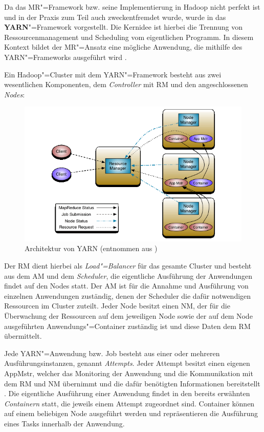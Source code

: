 Da das \ac{MR}"=Framework bzw. seine Implementierung in Hadoop nicht perfekt ist und in der Praxis zum Teil auch zweckentfremdet wurde, wurde in \cite{Vavilapalli2013} das \textbf{\ac{YARN}}"=Framework vorgestellt.
Die Kernidee ist hierbei die Trennung von Ressourcenmanagement und Scheduling vom eigentlichen Programm.
In diesem Kontext bildet der \ac{MR}"=Ansatz eine mögliche Anwendung, die mithilfe des \ac{YARN}"=Frameworks ausgeführt wird \cite{Vavilapalli2013}.

Ein Hadoop"=Cluster mit dem \ac{YARN}"=Framework besteht aus zwei wesentlichen Komponenten, dem \emph{Controller} mit \ac{RM} und den angeschlossenen \emph{Nodes}:

\begin{figure}[h]
    \includegraphics{./images/yarn_architecture.png}
    \caption[Architektur von YARN]
    {Architektur von YARN (entnommen aus \cite{HadoopYarnArch271})}
    \label{fig:yarnarch}
\end{figure}

Der \ac{RM} dient hierbei als \emph{Load"=Balancer} für das gesamte Cluster und besteht aus dem \ac{AM} und dem \emph{Scheduler}, die eigentliche Ausführung der Anwendungen findet auf den Nodes statt.
Der \ac{AM} ist für die Annahme und Ausführung von einzelnen Anwendungen zuständig, denen der Scheduler die dafür notwendigen Ressourcen im Cluster zuteilt.
Jeder Node besitzt einen \ac{NM}, der für die Überwachung der Ressourcen auf dem jeweiligen Node sowie der auf dem Node ausgeführten Anwendungs"=Container zuständig ist und diese Daten dem \ac{RM} übermittelt.

Jede YARN"=Anwendung bzw. Job besteht aus einer oder mehreren Ausführungsinstanzen, genannt \emph{Attempts}.
Jeder Attempt besitzt einen eigenen \ac{AppMstr}, welcher das Monitoring der Anwendung und die Kommunikation mit dem \ac{RM} und \ac{NM} übernimmt und die dafür benötigten Informationen bereitstellt \cite{HadoopYarnArch271}.
Die eigentliche Ausführung einer Anwendung findet in den bereits erwähnten \emph{Containern} statt, die jeweils einem Attempt zugeordnet sind.
Container können auf einem beliebigen Node ausgeführt werden und repräsentieren die Ausführung eines Tasks innerhalb der Anwendung.

